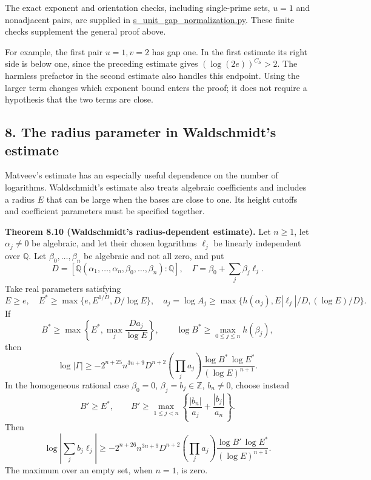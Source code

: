 \documentclass[
  11pt,
  a4paper,
]{article}
\begin{document}
The exact exponent and orientation checks, including single-prime sets,
\(u=1\) and nonadjacent pairs, are supplied in
\href{https://kokunoyumeto.github.io/open-math-courses-public/courses/TR-BAKER/verification/s_unit_gap_normalization.py}{s\_unit\_gap\_normalization.py}.
These finite checks supplement the general proof above.

For example, the first pair \(u=1,v=2\) has gap one. In the first
estimate its right side is below one, since the preceding estimate gives
\((\log(2e))^{C_S}>2\). The harmless prefactor in the second estimate
also handles this endpoint. Using the larger term changes which exponent
bound enters the proof; it does not require a hypothesis that the two
terms are close.

\subsection{8. The radius parameter in Waldschmidt's
estimate}\label{the-radius-parameter-in-waldschmidts-estimate}

Matveev's estimate has an especially useful dependence on the number of
logarithms. Waldschmidt's estimate also treats algebraic coefficients
and includes a radius \(E\) that can be large when the bases are close
to one. Its height cutoffs and coefficient parameters must be specified
together.

\textbf{Theorem 8.10 (Waldschmidt's radius-dependent estimate).} Let
\(n\ge1\), let \(\alpha_j\ne0\) be algebraic, and let their chosen
logarithms \(\ell_j\) be linearly independent over \(\mathbb Q\). Let
\(\beta_0,\ldots,\beta_n\) be algebraic and not all zero, and put \[
D=[\mathbb Q(\alpha_1,\ldots,\alpha_n,\beta_0,\ldots,\beta_n):\mathbb Q],
\quad \Gamma=\beta_0+\sum_j\beta_j\ell_j.
\] Take real parameters satisfying \[
E\ge e,\quad E^*\ge\max\{e,E^{1/D},D/\log E\},
\quad
a_j=\log A_j\ge
\max\{h(\alpha_j),E|\ell_j|/D,(\log E)/D\}.
\] If \[
B^*\ge\max\left\{E^*,\max_j\frac{D a_j}{\log E}\right\},
\qquad \log B^*\ge\max_{0\le j\le n}h(\beta_j),
\] then \[
\log|\Gamma|\ge
-2^{n+25}n^{3n+9}D^{n+2}
\left(\prod_j a_j\right)
\frac{\log B^*\,\log E^*}{(\log E)^{n+1}}. \tag{8.154}
\] In the homogeneous rational case \(\beta_0=0\),
\(\beta_j=b_j\in\mathbb Z\), \(b_n\ne0\), choose instead \[
B'\ge E^*,\qquad
B'\ge\max_{1\le j<n}
\left\{\frac{|b_n|}{a_j}+\frac{|b_j|}{a_n}\right\}.
\] Then \[
\log\left|\sum_jb_j\ell_j\right|\ge
-2^{n+26}n^{3n+9}D^{n+2}
\left(\prod_j a_j\right)
\frac{\log B'\,\log E^*}{(\log E)^{n+1}}. \tag{8.155}
\] The maximum over an empty set, when \(n=1\), is zero.
\end{document}
